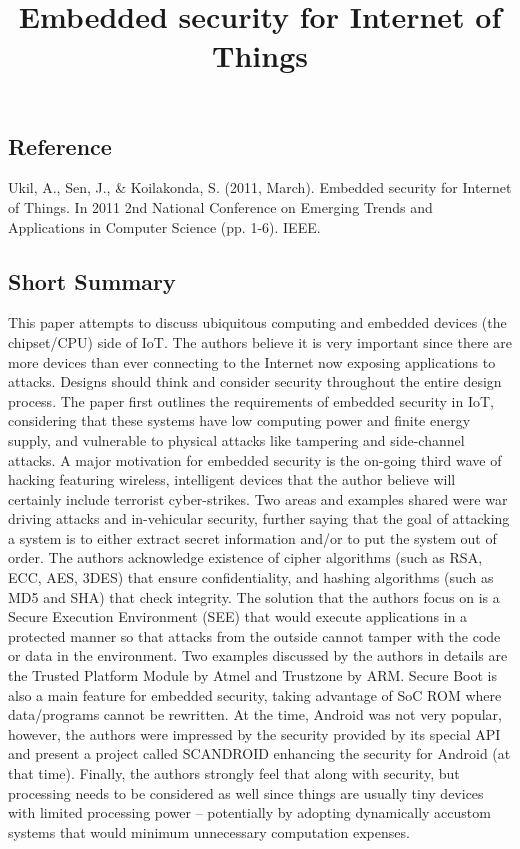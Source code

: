 \documentclass[11pt,a4paper]{article}
\title{Embedded security for Internet of Things}
\author{}
\date{}
\begin{document}
\maketitle

\subsection*{Reference}
Ukil, A., Sen, J., \& Koilakonda, S. (2011, March). Embedded security for Internet of Things. In 2011 2nd National Conference on Emerging Trends and Applications in Computer Science (pp. 1-6). IEEE.

\subsection*{Short Summary} 
This paper attempts to discuss ubiquitous computing and embedded devices (the chipset/CPU) side of IoT. The authors believe it is very important since there are more devices than ever connecting to the Internet now exposing applications to attacks. Designs should think and consider security throughout the entire design process. The paper first outlines the requirements of embedded security in IoT, considering that these systems have low computing power and finite energy supply, and vulnerable to physical attacks like tampering and side-channel attacks. A major motivation for embedded security is the on-going third wave of hacking featuring wireless, intelligent devices that the author believe will certainly include terrorist cyber-strikes. Two areas and examples shared were war driving attacks and in-vehicular security, further saying that the goal of attacking a system is to either extract secret information and/or to put the system out of order. The authors acknowledge existence of cipher algorithms (such as RSA, ECC, AES, 3DES) that ensure confidentiality, and hashing algorithms (such as MD5 and SHA) that check integrity. The solution that the authors focus on is a Secure Execution Environment (SEE) that would execute applications in a protected manner so that attacks from the outside cannot tamper with the code or data in the environment. Two examples discussed by the authors in details are the Trusted Platform Module by Atmel and Trustzone by ARM. Secure Boot is also a main feature for embedded security, taking advantage of SoC ROM where data/programs cannot be rewritten. At the time, Android was not very popular, however, the authors were impressed by the security provided by its special API and present a project called SCANDROID enhancing the security for Android (at that time). Finally, the authors strongly feel that along with security, but processing needs to be considered as well since things are usually tiny devices with limited processing power – potentially by adopting dynamically accustom systems that would minimum unnecessary computation expenses.
\end{document}
